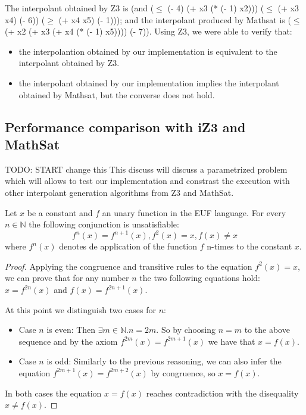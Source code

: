 

The interpolant obtained by Z3 is 
 (and ($\leq$ (- 4) (+ x3 (* (- 1) x2))) ($\leq$ (+ x3 x4) (- 6)) ($\geq$ (+ x4 x5) (- 1))); 
 and the interpolant produced by Mathsat is ($\leq$ (+ x2 (+ x3 (+ x4 (* (- 1) x5)))) (- 7)).
 Using Z3, we were able to verify that: 
 \begin{itemize}
 \item the interpolantion obtained by our implementation
 is equivalent to the interpolant obtained by Z3. 
 \item the interpolant obtained by our implementation implies the interpolant
 obtained by Mathsat, but the converse does not hold.
 \end{itemize}



\subsection{Performance comparison with iZ3 and MathSat}\label{performance_oct}

TODO: START change this
This discuss will discuss a parametrized problem which will allows to test 
our implementation and constrast the execution with other interpolant generation
algorithms from Z3 and MathSat.

\begin{lemma} \label{performance_test_lemma_oct}
  Let $x$ be a constant and $f$ an unary function in the EUF language. 
  For every $n \in \mathbb{N}$ the following conjunction is unsatisfiable:
  \begin{equation*}
    f^n(x) = f^{n+1}(x), f^2(x) = x, f(x) \neq x
  \end{equation*}
  where $f^n(x)$ denotes de application of the function $f$ n-times
  to the constant $x$.
\end{lemma}

\begin{proof}
  Applying the congruence and transitive rules to the equation $f^2(x) = x$, 
  we can prove that for any number $n$ the two following equations hold:
  $x = f^{2n}(x)$ and $f(x) = f^{2n+1}(x)$.

  At this point we distinguish two cases for $n$:

  \begin{itemize}
    \item Case $n$ is even: Then $\exists m \in \mathbb{N} . n = 2m$.
      So by choosing $n = m$ to the above sequence
      and by the axiom $f^{2m}(x) = f^{2m+1}(x)$ we have that
      $x = f(x)$.
    \item Case $n$ is odd: Similarly to the previous reasoning, 
      we can also infer the equation $f^{2m+1}(x) = f^{2m+2}(x)$
      by congruence, so $x = f(x)$.
    \end{itemize}

    In both cases the equation $x = f(x)$ reaches contradiction with the
    disequality $x \neq f(x)$.
\end{proof}

